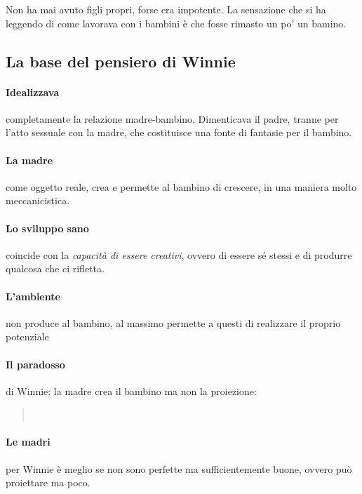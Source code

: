 \documentclass[12pt, a4paper]{article}
\begin{document}
Non ha mai avuto figli propri, forse era impotente. La sensazione che si ha leggendo di come lavorava con i bambini \`e che fosse rimasto un po' un bamino.

\subsection{La base del pensiero di Winnie}

\paragraph{Idealizzava} completamente la relazione madre-bambino. Dimenticava il padre, tranne per l'atto sessuale con la madre, che costituisce una fonte di fantasie per il bambino. 

\paragraph{La madre} come oggetto reale, crea e permette al bambino di crescere, in una maniera molto meccanicistica.

\paragraph{Lo sviluppo sano} coincide con la \emph{capacit\`a di essere creativi}, ovvero di essere s\'e stessi e di produrre qualcosa che ci rifletta.

\paragraph{L'ambiente} non produce al bambino, al massimo permette a questi di realizzare il proprio potenziale

\paragraph{Il paradosso} di Winnie: la madre crea il bambino ma non la proiezione:
\medskip
\begin{quote} \\ 
\end{quote}
\medskip

\paragraph{Le madri} per Winnie \`e meglio se non sono perfette ma sufficientemente buone, ovvero può proiettare ma poco.
\end{document}
